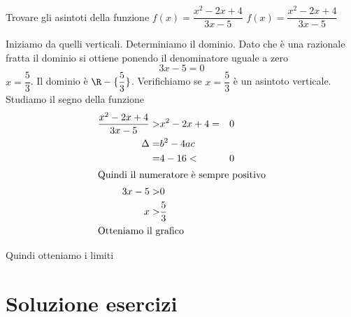 \begin{exercise}
Trovare gli asintoti della funzione $f(x)=\dfrac{x^2-2x+4}{3x-5}$
	\tcblower
$f(x)=\dfrac{x^2-2x+4}{3x-5}$

Iniziamo da quelli verticali. Determiniamo il dominio. Dato che è una razionale fratta il dominio si ottiene ponendo il denominatore uguale a zero\[3x-5=0\] $x=\dfrac{5}{3}$. Il dominio è $\R-\lbrace\dfrac{5}{3}\rbrace$. Verifichiamo se $x=\dfrac{5}{3}$ è un asintoto verticale. Studiamo il segno della funzione
\begin{align*}
\dfrac{x^2-2x+4}{3x-5}>&
x^2-2x+4=&0\\
\Delta=&b^2-4ac\\
=&4-16<&0\\
\intertext{Quindi il numeratore è sempre positivo}
3x-5>&0\\
x>&\dfrac{5}{3}\\
\intertext{Otteniamo il grafico}
\end{align*}
	\begin{center}
	
\end{center}
Quindi otteniamo i limiti
\end{exercise}

\tcbstoprecording
\newpage
\section{Soluzione esercizi}
\tcbinputrecords
